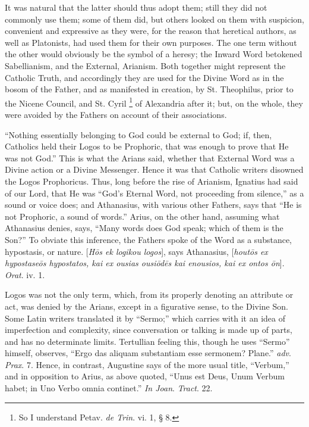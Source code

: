 It was natural that the latter should thus adopt them; still they
did not commonly use them; some of them did, but others looked on them
with suspicion, convenient and expressive as they were, for the reason
that heretical authors, as well as Platonists, had used them for their
own purposes. The one term without the other would obviously be the
symbol of a heresy; the Inward Word betokened Sabellianism, and the
External, Arianism. Both together might represent the Catholic Truth,
and accordingly they are used for the Divine Word as in the bosom of
the Father, and as manifested in creation, by St. Theophilus, prior to
the Nicene Council, and St. Cyril \footnote{So I understand Petav. \emph{de Trin}. vi. 1, § 8.} of Alexandria after it; but, on the whole, they were
avoided by the Fathers on account of their associations.

``Nothing essentially belonging to God could be external to
God; if, then, Catholics held their Logos to be Prophoric, that was
enough to prove that He was not God.'' This is what the Arians
said, whether that External Word was a Divine action or a Divine
Messenger. Hence it was that Catholic writers disowned the Logos
Prophoricus. Thus, long before the rise of Arianism, Ignatius had said
of our Lord, that He was ``God's Eternal Word, not proceeding from
silence,'' as a sound or voice does; and Athanasius, with various
other Fathers, says that ``He is not Prophoric, a sound of
words.'' Arius, on the other hand, assuming what Athanasius
denies, says, ``Many words does God speak; which of them is the
Son?'' To obviate this inference, the Fathers spoke of the Word as
a substance, hypostasis, or nature. [\emph{H\={o}s ek logikou logos}],
says Athanasius, [\emph{hout\={o}s ex hypostase\={o}s hypostatos,
kai ex ousias ousi\={o}d\={e}s kai enousios, kai ex ontos \={o}n}].
\emph{Orat}. iv. 1.

Logos was not the only term, which, from its properly denoting an
attribute or act, was denied by the Arians, except in a figurative
sense, to the Divine Son. Some Latin writers translated it by ``Sermo;''
which carries with it an idea of imperfection and complexity, since
conversation or talking is made up of parts, and has no determinate
limits. Tertullian feeling this, though he uses ``Sermo''
himself, observes, ``Ergo das aliquam substantiam esse sermonem?
Plane.'' \emph{adv}. \emph{Prax}. 7. Hence, in contrast, Augustine
says of the more usual title, ``Verbum,'' and in opposition to
Arius, as above quoted, ``Unus est Deus, Unum Verbum habet;
in Uno Verbo omnia continet.'' \emph{In Joan}. \emph{Tract}. 22.

